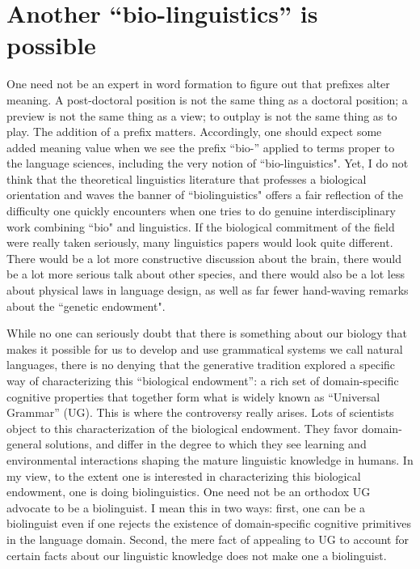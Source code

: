 \chapter{Another ``bio-linguistics'' is possible}
One need not be an expert in word formation to figure out that prefixes alter meaning. A post-doctoral position is not the same thing as a doctoral position; a preview is not the same thing as a view; to outplay is not the same thing as to play. The addition of a prefix matters. Accordingly, one should expect some added meaning value when we see the prefix ``bio-'' applied to terms proper to the language sciences, including the very notion of ``bio-linguistics". Yet, I do not think that the theoretical linguistics literature that professes a biological orientation and waves the banner of ``biolinguistics" offers a fair reflection of the difficulty one quickly encounters when one tries to do genuine interdisciplinary work combining  ``bio" and linguistics. If the biological commitment of the field were really taken seriously, many linguistics papers would look quite different. There would be a lot more constructive discussion about the brain, there would be a lot more serious talk about other species, and there would also be a lot less about physical laws in language design, as well as far fewer hand-waving remarks about the ``genetic endowment".

While no one can seriously doubt that there is something about our biology that makes it possible for us to develop and use grammatical systems we call natural languages, there is no denying that the generative tradition explored a specific way of characterizing this ``biological endowment'': a rich set of domain-specific cognitive properties that together form what is widely known as ``Universal Grammar'' (UG). This is where the controversy really arises. Lots of scientists object to this characterization of the biological endowment. They favor domain-general solutions, and differ in the degree to which they see learning and environmental interactions shaping the mature linguistic knowledge in humans. In my view, to the extent one is interested in characterizing this biological endowment, one is doing biolinguistics. One need not be an orthodox UG advocate to be a biolinguist. I mean this in two ways: first, one can be a biolinguist even if one rejects the existence of domain-specific cognitive primitives in the language domain. Second, the mere fact of appealing to UG to account for certain facts about our linguistic knowledge does not make one a biolinguist.

